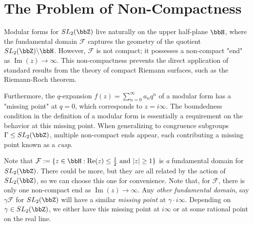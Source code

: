 \label{app:cusps}

\section{The Problem of Non-Compactness}

Modular forms for $SL_2(\bbZ)$ live naturally on the upper half-plane $\bbH$, where the fundamental domain $\mathcal{F}$ captures the geometry of the quotient $SL_2(\bbZ)\backslash \bbH$. However, $\mathcal{F}$ is not compact; it possesses a non-compact "end" as $\operatorname{Im}(z) \to \infty$. This non-compactness prevents the direct application of standard results from the theory of compact Riemann surfaces, such as the Riemann-Roch theorem.

Furthermore, the $q$-expansion $f(z) = \sum_{n=0}^{\infty} a_n q^n$ of a modular form has a "missing point" at $q = 0$, which corresponds to $z = i\infty$. The boundedness condition in the definition of a modular form is essentially a requirement on the behavior at this missing point. When generalizing to congruence subgroups $\Gamma \leq SL_2(\bbZ)$, multiple non-compact ends appear, each contributing a missing point known as a \emph{cusp}.

Note that $\mathcal F:=\{ z \in \bbH : \operatorname{Re}(z) \leq \frac{1}{2}  \ \text{and } |z|\geq 1 \}$ is \emph{a} fundamental domain for $SL_2(\bbZ)$. There could be more, but they are all related by the action of $SL_2(\bbZ)$, so we can choose this one for convenience. Note that, for $\mathcal F$, there is only one non-compact end as $\operatorname{Im}(z) \to \infty$. Any \emph{other fundamental domain}, say $\gamma \mathcal F$ for $SL_2(\bbZ)$ will have a similar \emph{missing point} at $\gamma \cdot i\infty$. Depending on $\gamma \in SL_2(\bbZ)$, we either have this missing point at $i\infty$ or at some rational point on the real line. 


